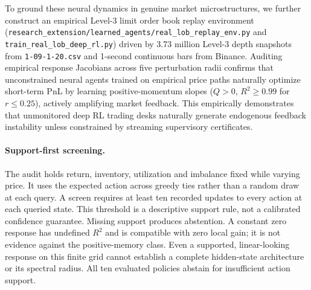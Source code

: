 \documentclass[10pt,twocolumn,letterpaper]{article}
\theoremstyle{definition}
\theoremstyle{remark}
\begin{document}
To ground these neural dynamics in genuine market microstructures, we further construct an empirical Level-3 limit order book replay environment (\texttt{research\_extension/learned\_agents/real\_lob\_replay\_env.py} and \texttt{train\_real\_lob\_deep\_rl.py}) driven by 3.73 million Level-3 depth snapshots from \texttt{1-09-1-20.csv} and 1-second continuous bars from Binance. Auditing empirical response Jacobians across five perturbation radii confirms that unconstrained neural agents trained on empirical price paths naturally optimize short-term PnL by learning positive-momentum slopes ($Q > 0$, $R^2 \ge 0.99$ for $r \le 0.25$), actively amplifying market feedback. This empirically demonstrates that unmonitored deep RL trading desks naturally generate endogenous feedback instability unless constrained by streaming supervisory certificates.

\paragraph{Support-first screening.}
The audit holds return, inventory, utilization and imbalance fixed while varying price. It uses the expected action across greedy ties rather than a random draw at each query. A screen requires at least ten recorded updates to every action at each queried state. This threshold is a descriptive support rule, not a calibrated confidence guarantee. Missing support produces abstention. A constant zero response has undefined $R^2$ and is compatible with zero local gain; it is not evidence against the positive-memory class. Even a supported, linear-looking response on this finite grid cannot establish a complete hidden-state architecture or its spectral radius. All ten evaluated policies abstain for insufficient action support.
\end{document}
